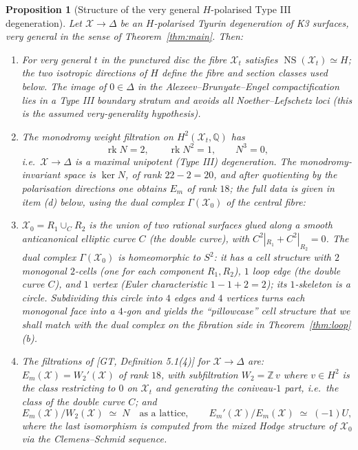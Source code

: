 \documentclass[11pt]{article}
\newtheorem{proposition}[theorem]{Proposition}
\newcommand{\X}{\mathcal{X}}
\newcommand{\D}{\Delta}
\newcommand{\bZ}{\mathbb{Z}}
\newcommand{\bQ}{\mathbb{Q}}
\DeclareMathOperator{\rk}{rk}
\DeclareMathOperator{\NS}{NS}
\begin{document}
\begin{proposition}[Structure of the very general $H$-polarised Type III
degeneration]\label{prop:deg-side}
Let $\X\to\D$ be an $H$-polarised Tyurin degeneration of K3 surfaces, very
general in the sense of Theorem~\ref{thm:main}. Then:
\begin{enumerate}[label=(\alph*),leftmargin=2em]
\item For very general $t$ in the punctured disc the fibre $\X_t$
satisfies $\NS(\X_t)\simeq H$; the two isotropic directions of $H$
define the fibre and section classes used below. The image of $0\in\D$
in the Alexeev--Brunyate--Engel compactification lies in a Type III
boundary stratum and avoids all Noether--Lefschetz loci (this is the
assumed very-generality hypothesis).
\item The monodromy weight filtration on $H^2(\X_t,\bQ)$ has
\[
\rk N = 2,\qquad \rk N^2 = 1,\qquad N^3=0,
\]
i.e.\ $\X\to\D$ is a maximal unipotent (Type III) degeneration. The
monodromy-invariant space is $\ker N$, of rank $22-2=20$, and after
quotienting by the polarisation directions one obtains
$E_m$ of rank $18$; the full data is given in item (d) below, using the
dual complex $\Gamma(\X_0)$ of the central fibre:
\item $\X_0=R_1\cup_C R_2$ is the union of two rational surfaces glued along
a smooth anticanonical elliptic curve $C$ (the double curve), with
$C^2|_{R_1}+C^2|_{R_2}=0$. The dual complex $\Gamma(\X_0)$ is homeomorphic
to $S^2$: it has a cell structure with $2$ monogonal $2$-cells (one for
each component $R_1,R_2$), $1$ loop edge (the double curve $C$), and $1$
vertex (Euler characteristic $1-1+2=2$); its $1$-skeleton is a circle.
Subdividing this circle into $4$ edges and $4$ vertices turns each
monogonal face into a $4$-gon and yields the ``pillowcase'' cell
structure that we shall match with the dual complex on the fibration side
in Theorem~\ref{thm:loop}(b).


\item The filtrations of [GT, Definition 5.1(4)] for $\X\to\D$ are:
$E_m(\X)=W_2'(\X)$ of rank $18$, with subfiltration $W_2 = \bZ\, v$ where
$v\in H^2$ is the class restricting to $0$ on $\X_t$ and generating the
coniveau-$1$ part, i.e.\ the class of the double curve $C$; and
\[
E_m(\X)/W_2(\X)\;\simeq\;N
\quad\text{as a lattice},
\qquad
E_m'(\X)/E_m(\X)\;\simeq\;(-1)U,
\]
where the last isomorphism is computed from the mixed Hodge structure of
$\X_0$ via the Clemens--Schmid sequence.
\end{enumerate}
\end{proposition}
\end{document}
